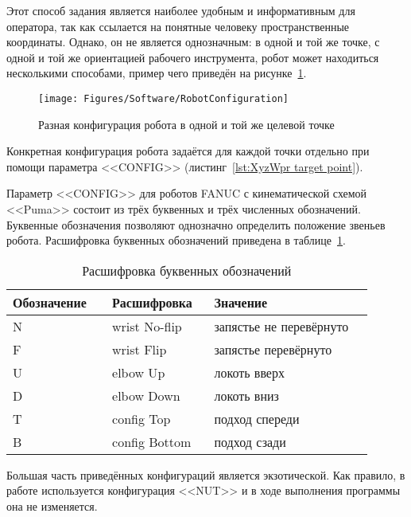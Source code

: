 Этот способ задания является наиболее удобным и информативным для оператора, так как ссылается на понятные человеку пространственные координаты.
Однако, он не является однозначным: в одной и той же точке, с одной и той же ориентацией рабочего инструмента, робот может находиться несколькими способами, пример чего приведён на рисунке~\ref{fig:Robot Configuration}.

\begin{figure}[H]
    \centering
    \vspace{14pt}
    \texttt{[image: Figures/Software/RobotConfiguration]}
    \caption{Разная конфигурация робота в одной и той же целевой точке}
    \label{fig:Robot Configuration}
\end{figure}

Конкретная конфигурация робота задаётся для каждой точки отдельно при помощи параметра <<CONFIG>> (листинг~\ref{lst:XyzWpr target point}).

Параметр <<CONFIG>> для роботов FANUC с кинематической схемой <<Puma>> состоит из трёх буквенных и трёх численных обозначений.
Буквенные обозначения позволяют однозначно определить положение звеньев робота.
Расшифровка буквенных обозначений приведена в таблице~\ref{tab:Robot Config}.

\begin{longtable}[H]{|p{0.25\linewidth}|p{0.25\linewidth}|p{0.4\linewidth}|}
    \caption{Расшифровка буквенных обозначений}
    \label{tab:Robot Config} \\
    \hline
    Обозначение & Расшифровка   & Значение                \\ \hline
    N           & wrist No-flip & запястье не перевёрнуто \\ \hline
    F           & wrist Flip    & запястье перевёрнуто    \\ \hline
    U           & elbow Up      & локоть вверх            \\ \hline
    D           & elbow Down    & локоть вниз             \\ \hline
    T           & config Top    & подход спереди          \\ \hline
    B           & config Bottom & подход сзади            \\ \hline
\end{longtable}

Большая часть приведённых конфигураций является экзотической.
Как правило, в работе используется конфигурация <<NUT>> и в ходе выполнения программы она не изменяется.

